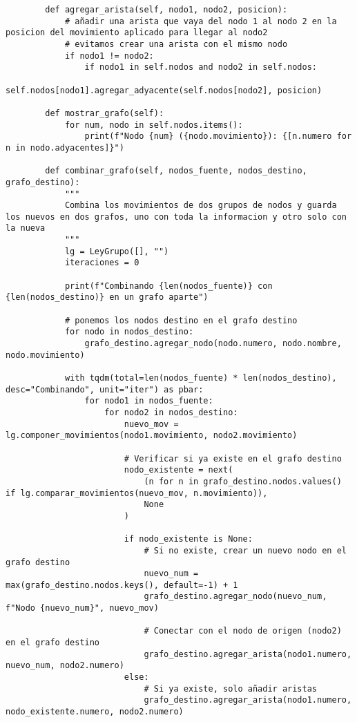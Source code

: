 \begin{lstlisting}
        def agregar_arista(self, nodo1, nodo2, posicion):
            # añadir una arista que vaya del nodo 1 al nodo 2 en la posicion del movimiento aplicado para llegar al nodo2
            # evitamos crear una arista con el mismo nodo
            if nodo1 != nodo2:
                if nodo1 in self.nodos and nodo2 in self.nodos:
                    self.nodos[nodo1].agregar_adyacente(self.nodos[nodo2], posicion)            
        
        def mostrar_grafo(self):
            for num, nodo in self.nodos.items():
                print(f"Nodo {num} ({nodo.movimiento}): {[n.numero for n in nodo.adyacentes]}")           
       
        def combinar_grafo(self, nodos_fuente, nodos_destino, grafo_destino):
            """
            Combina los movimientos de dos grupos de nodos y guarda los nuevos en dos grafos, uno con toda la informacion y otro solo con la nueva
            """
            lg = LeyGrupo([], "")
            iteraciones = 0
    
            print(f"Combinando {len(nodos_fuente)} con {len(nodos_destino)} en un grafo aparte")
            
            # ponemos los nodos destino en el grafo destino
            for nodo in nodos_destino:
                grafo_destino.agregar_nodo(nodo.numero, nodo.nombre, nodo.movimiento)
    
            with tqdm(total=len(nodos_fuente) * len(nodos_destino), desc="Combinando", unit="iter") as pbar:
                for nodo1 in nodos_fuente:
                    for nodo2 in nodos_destino:
                        nuevo_mov = lg.componer_movimientos(nodo1.movimiento, nodo2.movimiento)
    
                        # Verificar si ya existe en el grafo destino
                        nodo_existente = next(
                            (n for n in grafo_destino.nodos.values() if lg.comparar_movimientos(nuevo_mov, n.movimiento)), 
                            None
                        )
    
                        if nodo_existente is None:
                            # Si no existe, crear un nuevo nodo en el grafo destino
                            nuevo_num = max(grafo_destino.nodos.keys(), default=-1) + 1
                            grafo_destino.agregar_nodo(nuevo_num, f"Nodo {nuevo_num}", nuevo_mov)
                            
                            # Conectar con el nodo de origen (nodo2) en el grafo destino
                            grafo_destino.agregar_arista(nodo1.numero, nuevo_num, nodo2.numero)
                        else:
                            # Si ya existe, solo añadir aristas
                            grafo_destino.agregar_arista(nodo1.numero, nodo_existente.numero, nodo2.numero)
    

\end{lstlisting}
